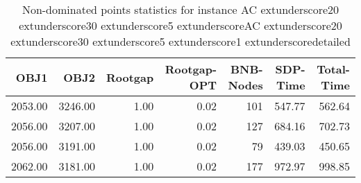 \begin{table}
\caption{Non-dominated points statistics for instance AC	extunderscore20	extunderscore30	extunderscore5	extunderscoreAC	extunderscore20	extunderscore30	extunderscore5	extunderscore1	extunderscoredetailed}
\label{tab:stats/AC_20_30_5_AC_20_30_5_1_detailed}
\begin{tabular}{rrrrrrr}
\toprule
OBJ1 & OBJ2 & Rootgap & Rootgap-OPT & BNB-Nodes & SDP-Time & Total-Time \\
\midrule
2053.00 & 3246.00 & 1.00 & 0.02 & 101 & 547.77 & 562.64 \\
2056.00 & 3207.00 & 1.00 & 0.02 & 127 & 684.16 & 702.73 \\
2056.00 & 3191.00 & 1.00 & 0.02 & 79 & 439.03 & 450.65 \\
2062.00 & 3181.00 & 1.00 & 0.02 & 177 & 972.97 & 998.85 \\
\bottomrule
\end{tabular}
\end{table}
